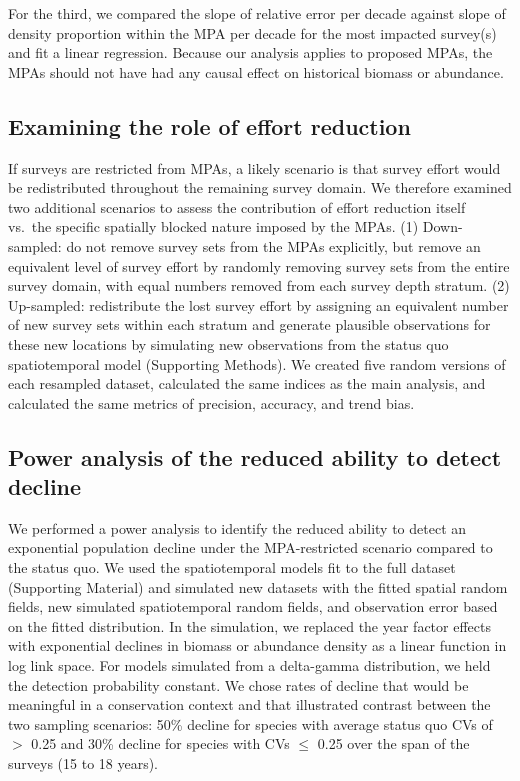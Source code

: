 \documentclass[12pt]{article}
\newcommand{\R}[1]{\label{#1}\linelabel{#1}}
\begin{document}
\begin{spacing}{1.4}
For the third, we compared the slope of relative error per decade against slope of density proportion within the MPA per decade for the most impacted survey(s) and fit a linear regression.
Because our analysis applies to proposed MPAs, the MPAs should not have had any causal effect on historical biomass or abundance.

\subsection*{Examining the role of effort reduction}

If surveys are restricted from MPAs, a likely scenario is that survey effort would be redistributed throughout the remaining survey domain.
We therefore examined two additional scenarios to assess the contribution of effort reduction itself vs.\ the specific spatially blocked nature imposed by the MPAs.
(1) Down-sampled: do not remove survey sets from the MPAs explicitly, but remove an equivalent level of survey effort by randomly removing survey sets from the entire survey domain, with equal numbers removed from each survey depth stratum.
(2) Up-sampled: redistribute the lost survey effort by assigning an equivalent number of new survey sets within each stratum and generate plausible observations for these new locations by simulating new observations from the status quo spatiotemporal model (Supporting Methods).
We created five random versions of each resampled dataset, calculated the same indices as the main analysis, and calculated the same metrics of precision, accuracy, and trend bias.

\subsection*{Power analysis of the reduced ability to detect decline}

We performed a power analysis to identify the reduced ability to detect an exponential population decline under the MPA-restricted scenario compared to the status quo.
We used the spatiotemporal models fit to the full dataset (Supporting Material) and simulated new datasets with the fitted spatial random fields, new simulated spatiotemporal random fields, and observation error based on the fitted distribution.
In the simulation, we replaced the year factor effects with exponential declines in biomass or abundance density as a linear function in log link space.
For models simulated from a delta-gamma distribution, we held the detection probability constant.
We chose rates of decline that would be meaningful \R{A4}in a conservation context and that illustrated contrast between the two sampling scenarios: 50\% decline for species with average status quo CVs of $>$ 0.25 and 30\% decline for species with CVs $\le$ 0.25 over the span of the surveys (15 to 18 years).


\end{spacing}
\end{document}
